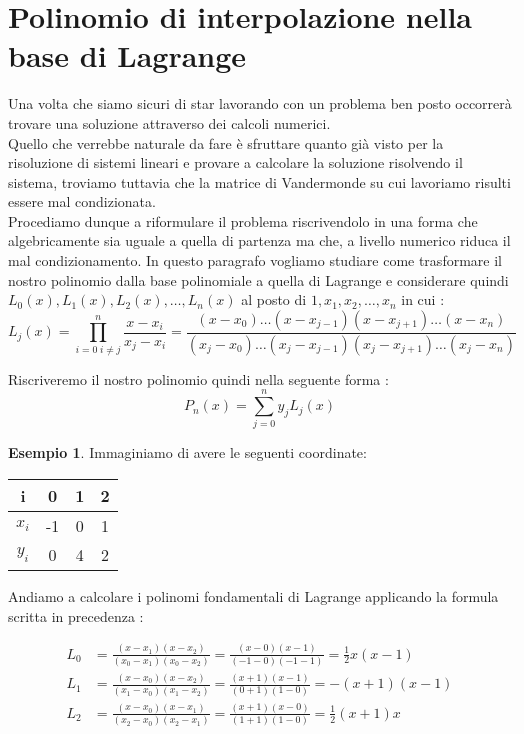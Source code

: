 \documentclass[12pt, a4paper]{book}
\theoremstyle{definition}
\newtheorem{exmp}{Esempio}[section]
\begin{document}
\section{Polinomio di interpolazione nella base di Lagrange}
\begin{flushleft}
Una volta che siamo sicuri di star lavorando con un problema ben posto occorrerà trovare una soluzione attraverso dei calcoli numerici.\\
Quello che verrebbe naturale da fare è sfruttare quanto già visto per la risoluzione di sistemi lineari e provare a calcolare la soluzione risolvendo il sistema, troviamo tuttavia che la matrice di Vandermonde su cui lavoriamo risulti essere mal condizionata.\\
Procediamo dunque a riformulare il problema riscrivendolo in una forma che algebricamente sia uguale a quella di partenza ma che, a livello numerico riduca il mal condizionamento.
In questo paragrafo vogliamo studiare come trasformare il nostro polinomio dalla base polinomiale a quella di Lagrange e considerare quindi $L_{0}(x), L_{1}(x), L_{2}(x), \dots,L_{n}(x)$ al posto di $1, x_{1}, x_{2}, \dots,x_{n}$ in cui : 
\[
	L_{j}(x) = \prod_{i = 0 \; i \neq j}^{n} \frac{x-x_{i}}{x_{j}-x_{i}} = 
		\frac{(x-x_{0}) \dots (x-x_{j-1})(x-x_{j+1}) \dots (x-x_{n}) }{(x_{j}-x_{0}) \dots (x_{j}-x_{j-1}) (x_{j}-x_{j+1}) \dots (x_{j}-x_{n})}
\]

Riscriveremo il nostro polinomio quindi nella seguente forma :
\[ 
	P_{n}(x) = \sum_{j=0}^{n} y_{j}L_{j}(x)
\]

\begin{exmp}
Immaginiamo di avere le seguenti coordinate:

	\begin{center}
 		\begin{tabular}{||c c c c||}
 		\hline
 			i & 0 & 1 & 2 \\ [0.5ex] 
 		\hline\hline
 			$x_{i}$ & -1 & 0 & 1 \\ 
 		\hline
 		 	$y_{i}$ & 0 & 4 & 2 \\
		\hline
		\end{tabular}
	\end{center}

Andiamo a calcolare i polinomi fondamentali di Lagrange applicando la formula scritta in precedenza :

\[ 
	\begin{split}
		L_{0} &= \frac{(x-x_{1})(x-x_{2})}{(x_{0}-x_{1})(x_{0}-x_{2})} =  \frac{(x-0)(x-1)}{(-1-0)(-1-1)} = \frac{1}{2}x(x-1) \\
		L_{1} &= \frac{(x-x_{0})(x-x_{2})}{(x_{1}-x_{0})(x_{1}-x_{2})} = \frac{(x+1)(x-1)}{(0+1)(1-0)} = -(x+1)(x-1) \\
		L_{2} &= \frac{(x-x_{0})(x-x_{1})}{(x_{2}-x_{0})(x_{2}-x_{1})}  = \frac{(x+1)(x-0)}{(1+1)(1-0)} =  \frac{1}{2}(x+1)x
	\end{split}
\]


\end{exmp}
\end{flushleft}
\end{document}
